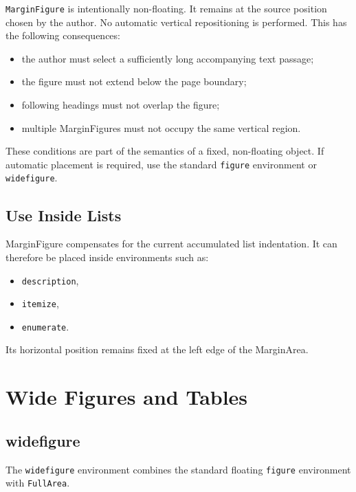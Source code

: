 \documentclass[
11pt,
a4paper,
oneside
]{scrbook}
\begin{document}
\texttt{MarginFigure} is intentionally non-floating.
It remains at the source position chosen by the author.
No automatic vertical repositioning is performed.
This has the following consequences:
\begin{itemize}
	\item the author must select a sufficiently long accompanying text passage;
	\item the figure must not extend below the page boundary;
	\item following headings must not overlap the figure;
	\item multiple MarginFigures must not occupy the same vertical region.
\end{itemize}
These conditions are part of the semantics of a fixed, non-floating object.
If automatic placement is required, use the standard \texttt{figure}
environment or \texttt{widefigure}.
	
\section{Use Inside Lists}
	
MarginFigure compensates for the current accumulated list indentation.
It can therefore be placed inside environments such as:
\begin{itemize}
	\item \texttt{description},
	\item \texttt{itemize},
	\item \texttt{enumerate}.
\end{itemize}
Its horizontal position remains fixed at the left edge of the MarginArea.


\chapter{Wide Figures and Tables}
\label{chap:wide-objects}
	
\section{widefigure}

The \texttt{widefigure} environment combines the standard floating
\texttt{figure} environment with \texttt{FullArea}.
\end{document}
